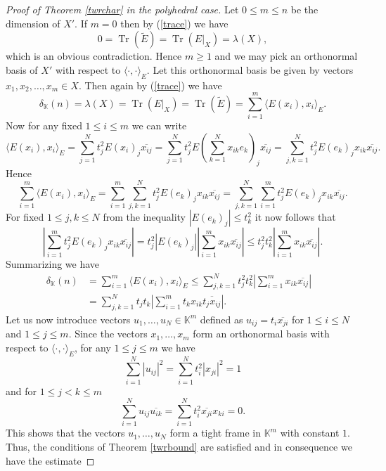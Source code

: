 \documentclass[12pt, reqno]{amsart}
\theoremstyle{definition}
\theoremstyle{remark}
\numberwithin{equation}{section}
\DeclareMathOperator{\tr}{Tr}
\begin{document}
\begin{proof}[Proof of Theorem \ref{twrchar} in the polyhedral case]
Let $0 \leq m \leq n$ be the dimension of $X'$. If $m=0$ then by (\ref{trace}) we have 
$$0 = \tr(\widetilde{E}) = \tr(E|_X) = \lambda(X),$$
which is an obvious contradiction. Hence $m \geq 1$ and we may pick an orthonormal basis of $X'$ with respect to $\langle \cdot, \cdot \rangle_E$. Let this orthonormal basis be given by vectors $x_1, x_2, \ldots, x_m \in X$. Then again by (\ref{trace}) we have
$$\delta_{\mathbb{K}}(n)=\lambda(X)=\tr(E|_X) = \tr(\widetilde{E}) = \sum_{i=1}^{m} \langle E(x_i), x_i \rangle_E.$$
Now for any fixed $1 \leq i \leq m$ we can write
$$\langle E(x_i), x_i \rangle_E = \sum_{j=1}^{N} t_j^2 E(x_i)_j \overline{x_{ij}}  = \sum_{j=1}^{N} t_j^2 E \left ( \sum_{k=1}^{N} x_{ik}e_k \right )_j \overline{x_{ij}} =\sum_{j, k=1}^N t_j^2 E(e_k)_jx_{ik}\overline{x_{ij}}.$$
Hence
$$\sum_{i=1}^{m} \langle E(x_i), x_i \rangle_E = \sum_{i=1}^{m} \sum_{j, k=1}^N t_j^2 E(e_k)_jx_{ik}\overline{x_{ij}} = \sum_{j, k=1}^N \sum_{i=1}^{m} t_j^2 E(e_k)_jx_{ik}\overline{x_{ij}}.$$
For fixed $1 \leq j, k \leq N$ from the inequality $|E(e_k)_j| \leq t_k^2$ it now follows that
\begin{equation}
\label{oszacowanie}
\left | \sum_{i=1}^{m} t_j^2 E(e_k)_jx_{ik}\overline{x_{ij}} \right | = t_j^2 |E(e_k)_j| \left | \sum_{i=1}^{m} x_{ik}\overline{x_{ij}} \right | \leq t_j^2 t_k^2 \left | \sum_{i=1}^{m} x_{ik}\overline{x_{ij}} \right |.
\end{equation}
Summarizing we have
\begin{equation}
\label{oszstala}
\begin{aligned}
\delta_{\mathbb{K}}(n) & = \sum_{i=1}^{m} \langle E(x_i), x_i \rangle_E  \leq  \sum_{j, k=1}^N  t_j^2 t_k^2 \left | \sum_{i=1}^{m} x_{ik}\overline{x_{ij}} \right | & \\
& =  \sum_{j, k=1}^N t_j t_k \left | \sum_{i=1}^{m} t_kx_{ik}\overline{t_jx_{ij}} \right |. 
\end{aligned}
\end{equation}
Let us now introduce vectors $u_1, \ldots, u_N \in \mathbb{K}^m$ defined as $u_{ij}=t_i \overline{x_{ji}}$ for $1 \leq i \leq N$ and $1 \leq j \leq m$. Since the vectors $x_1, \ldots, x_m$ form an orthonormal basis with respect to $\langle \cdot, \cdot \rangle_E$, for any $1 \leq j \leq m$ we have
$$\sum_{i=1}^{N} |u_{ij}|^2 = \sum_{i=1}^{N} t_i^2 |x_{ji}|^2 = 1$$
and for $1 \leq j < k \leq m$
$$\sum_{i=1}^{N} u_{ij}\overline{u_{ik}} = \sum_{i=1}^{N} t_i^2 \overline{x_{ji}}x_{ki} = 0.$$
This shows that the vectors $u_1, \ldots, u_N$ form a tight frame in $\mathbb{K}^m$ with constant $1$. Thus, the conditions of Theorem \ref{twrbound} are satisfied and in consequence we have the estimate

\end{proof}
\end{document}
